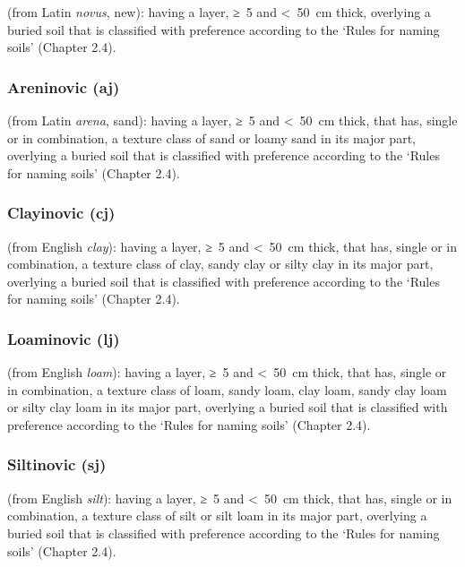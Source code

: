 \documentclass[
  letterpaper,
  DIV=11,
  numbers=noendperiod]{scrreprt}
\begin{document}
(from Latin \emph{novus}, new): having a layer, ≥~5 and \textless~50~cm
thick, overlying a buried soil that is classified with preference
according to the `Rules for naming soils' (Chapter 2.4).

\hypertarget{areninovic-aj}{%
\subsubsection{Areninovic (aj)}\label{areninovic-aj}}

(from Latin \emph{arena}, sand): having a layer, ≥~5 and \textless~50~cm
thick, that has, single or in combination, a texture class of sand or
loamy sand in its major part, overlying a buried soil that is classified
with preference according to the `Rules for naming soils' (Chapter 2.4).

\hypertarget{clayinovic-cj}{%
\subsubsection{Clayinovic (cj)}\label{clayinovic-cj}}

(from English \emph{clay}): having a layer, ≥~5 and \textless~50~cm
thick, that has, single or in combination, a texture class of clay,
sandy clay or silty clay in its major part, overlying a buried soil that
is classified with preference according to the `Rules for naming soils'
(Chapter 2.4).

\hypertarget{loaminovic-lj}{%
\subsubsection{Loaminovic (lj)}\label{loaminovic-lj}}

(from English \emph{loam}): having a layer, ≥~5 and \textless~50~cm
thick, that has, single or in combination, a texture class of loam,
sandy loam, clay loam, sandy clay loam or silty clay loam in its major
part, overlying a buried soil that is classified with preference
according to the `Rules for naming soils' (Chapter 2.4).

\hypertarget{siltinovic-sj}{%
\subsubsection{Siltinovic (sj)}\label{siltinovic-sj}}

(from English \emph{silt}): having a layer, ≥~5 and \textless~50~cm
thick, that has, single or in combination, a texture class of silt or
silt loam in its major part, overlying a buried soil that is classified
with preference according to the `Rules for naming soils' (Chapter 2.4).
\end{document}
